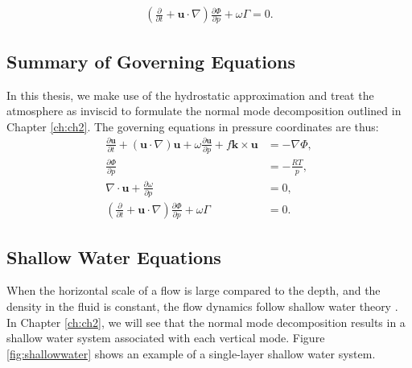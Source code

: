 \begin{align}
\left(\frac{\partial}{\partial t} + \mathbf{u} \cdot \nabla\right) \frac{\partial \Phi}{\partial p} + \omega \Gamma = 0. \label{eq:thermodynamic}
\end{align}

\subsection{Summary of Governing Equations}
In this thesis, we make use of the hydrostatic approximation and treat the atmosphere as inviscid to formulate the normal mode decomposition outlined in Chapter \ref{ch:ch2}. The governing equations in pressure coordinates are thus:
\begin{align}
\frac{\partial \mathbf{u}}{\partial t} + (\mathbf{u} \cdot \nabla) \mathbf{u} + \omega \frac{\partial \mathbf{u}}{\partial p} + f \mathbf{k} \times \mathbf{u}& = -\nabla \Phi, \label{eq:momentumFull}\\
\frac{\partial \Phi}{\partial p} &= -\frac{RT}{p},\label{eq:hydrostaticFull}\\
\nabla \cdot \mathbf{u} + \frac{\partial \omega}{\partial p} &= 0,\label{eq:continuityFull}\\
\left(\frac{\partial}{\partial t} + \mathbf{u} \cdot \nabla\right) \frac{\partial \Phi}{\partial p} + \omega \Gamma &= 0. \label{eq:thermodynamicFull}
\end{align}

\subsection{Shallow Water Equations}
\label{sec:shallowwater}
When the horizontal scale of a flow is large compared to the depth, and the density in the fluid is constant, the flow dynamics follow shallow water theory \cite{Vallis2006}. In Chapter \ref{ch:ch2}, we will see that the normal mode decomposition results in a shallow water system associated with each vertical mode. Figure \ref{fig:shallowwater} shows an example of a single-layer shallow water system.\\

